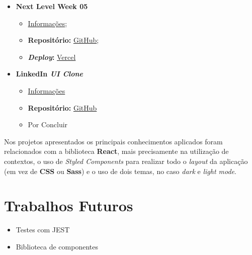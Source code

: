 \begin{minipage}[t]{0.45\textwidth}
	\begin{itemize}
		\item \textbf{Next Level Week 05}
			\begin{itemize}
				\item \href{http://nextlevelweek.com/}{Informações};
				\item \textbf{Repositório:} \href{https://github.com/TutoDS/nlw05-react}{GitHub};
				\item \textbf{\textit{Deploy}:} \href{https://podcastr-tutods.vercel.app/}{Vercel}
			\end{itemize}

		\item \textbf{LinkedIn \textit{UI Clone}}
			\begin{itemize}
				\item \href{https://www.youtube.com/watch?v=xP3cxbDUtrc}{Informações}
				\item \textbf{Repositório:} \href{https://github.com/TutoDS/reactjs-linkedin-clone}{GitHub}
				\item Por Concluir
			\end{itemize}
	\end{itemize}
\end{minipage}

\vspace{10pt}

Nos projetos apresentados os principais conhecimentos aplicados foram relacionados com a biblioteca \textbf{React}, mais precisamente na utilização de contextos, o uso de \textit{Styled Components} para realizar todo o \textit{layout} da aplicação (em vez de \textbf{CSS} ou \textbf{Sass}) e o uso de dois temas, no caso \textit{dark} e \textit{light mode}.

\section{Trabalhos Futuros}

\begin{itemize}
	\item Testes com JEST
	\item Biblioteca de componentes
\end{itemize}